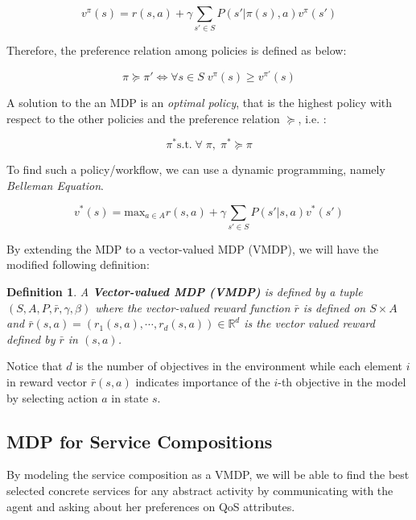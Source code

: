 \documentclass{sigchi}
\newtheorem{definition}{Definition}
\begin{document}
\begin{equation}\label{eq:value-func}
v^{\pi}(s) = r(s,a) + \gamma \sum_{s' \in S} P(s'|\pi(s),a) v^{\pi}(s') 
\end{equation}

Therefore, the preference relation among policies is defined as below:

\begin{equation}
\pi \succeq \pi' \Leftrightarrow \forall s \in S \; v^{\pi}(s) \geq v^{\pi'}(s)
\end{equation}

A solution to the an MDP is an \emph{optimal policy}, that is the highest policy with respect to the other policies and the preference relation $\succeq$, i.e. : 

\begin{equation}
\pi^* \text{s.t.} \; \forall \; \pi, \; \pi^* \succeq \pi
\end{equation}

To find such a policy/workflow, we can use a dynamic programming, namely \emph{Belleman Equation}.

\begin{equation}
v^*(s) = \text{max}_{a \in A} r(s,a) + \gamma \sum_{s' \in S} P(s'|s,a) v^*(s')
\end{equation}

By extending the MDP to a vector-valued MDP (VMDP), we will have the modified following definition: 

\begin{definition} \cite{DBLP:conf/ijcnn/AlizadehCL16}
A \textbf{Vector-valued MDP (VMDP)} is defined by a tuple $ (S, A, P, \bar{r}, \gamma, \beta)$ where the vector-valued reward function $\bar{r}$ is defined on $S \times A$ and $\bar{r}(s, a) = (r_1(s,a), \cdots, r_d(s,a)) \in \mathbb{R}^d$ is the vector valued reward defined by $\bar{r}$ in $(s,a)$. 
\end{definition}

Notice that $d$ is the number of objectives in the environment while each element $i$ in reward vector $\bar{r}(s, a)$ indicates importance of the $i$-th objective in the model by selecting action $a$ in state $s$. 


\subsection{MDP for Service Compositions}

By modeling the service composition as a VMDP, we will be able to find the best selected concrete services for any abstract activity by communicating with the agent and asking about her preferences on QoS attributes. 
\end{document}
